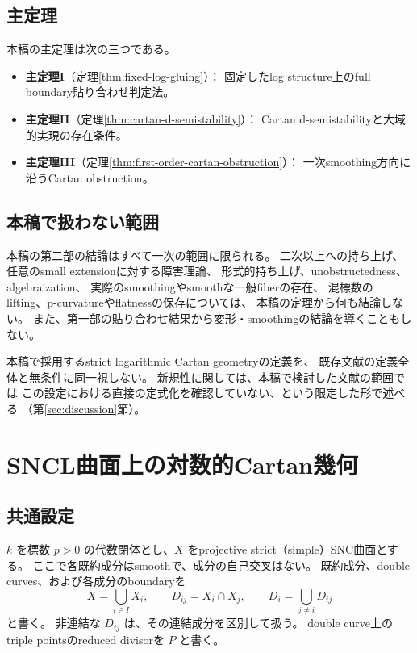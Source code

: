 \documentclass[uplatex,dvipdfmx,11pt]{jsarticle}
\numberwithin{equation}{section}
\theoremstyle{plain}
\theoremstyle{definition}
\theoremstyle{remark}
\begin{document}
\subsection*{主定理}

本稿の主定理は次の三つである。

\begin{itemize}
\item \textbf{主定理I}（定理\ref{thm:fixed-log-gluing}）：
固定したlog structure上のfull boundary貼り合わせ判定法。
\item \textbf{主定理II}（定理\ref{thm:cartan-d-semistability}）：
Cartan d-semistabilityと大域的実現の存在条件。
\item \textbf{主定理III}（定理\ref{thm:first-order-cartan-obstruction}）：
一次smoothing方向に沿うCartan obstruction。
\end{itemize}

\subsection*{本稿で扱わない範囲}

本稿の第二部の結論はすべて一次の範囲に限られる。
二次以上への持ち上げ、任意のsmall extensionに対する障害理論、
形式的持ち上げ、unobstructedness、algebraization、
実際のsmoothingやsmoothな一般fiberの存在、
混標数のlifting、p-curvatureやflatnessの保存については、
本稿の定理から何も結論しない。
また、第一部の貼り合わせ結果から変形・smoothingの結論を導くこともしない。

本稿で採用するstrict logarithmic Cartan geometryの定義を、
既存文献の定義全体と無条件に同一視しない。
新規性に関しては、本稿で検討した文献の範囲では
この設定における直接の定式化を確認していない、という限定した形で述べる
（第\ref{sec:discussion}節）。

\section{SNCL曲面上の対数的Cartan幾何}
\label{sec:definitions}

\subsection{共通設定}

\(k\) を標数 \(p>0\) の代数閉体とし、\(X\) をprojective strict（simple）SNC曲面とする。
ここで各既約成分はsmoothで、成分の自己交叉はない。
既約成分、double curves、および各成分のboundaryを
\[
X=\bigcup_{i\in I}X_i,\qquad
D_{ij}=X_i\cap X_j,\qquad
D_i=\bigcup_{j\ne i}D_{ij}
\]
と書く。
非連結な \(D_{ij}\) は、その連結成分を区別して扱う。
double curve上のtriple pointsのreduced divisorを \(P\) と書く。
\end{document}
